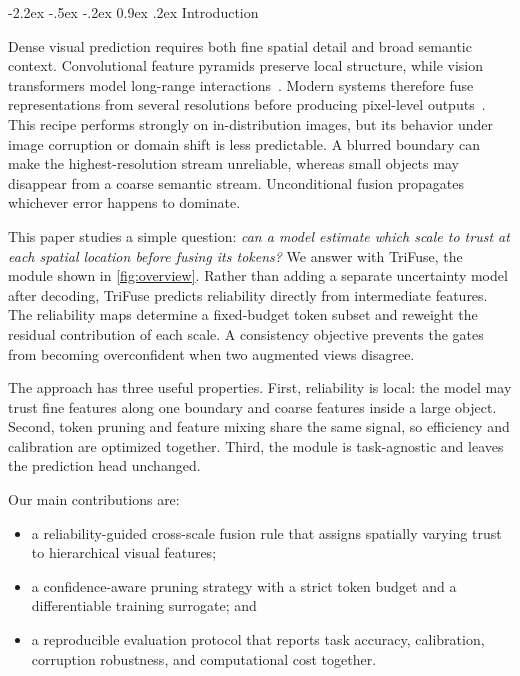 \documentclass[10pt,twocolumn,letterpaper]{article}
\makeatletter
\newcommand{\method}{TriFuse}
\renewcommand\section{\@startsection{section}{1}{\z@}%
  {-2.2ex \@plus -.5ex \@minus -.2ex}%
  {0.9ex \@plus .2ex}%
  {\normalfont\large\bfseries\color{iccvblue}}}
\makeatother
\begin{document}
\section{Introduction}
\label{sec:introduction}

Dense visual prediction requires both fine spatial detail and broad semantic
context. Convolutional feature pyramids preserve local structure, while vision
transformers model long-range interactions~\cite{he2016resnet,dosovitskiy2021vit,
liu2021swin}. Modern systems therefore fuse representations from several
resolutions before producing pixel-level outputs~\cite{lin2017fpn,
cheng2022mask2former}. This recipe performs strongly on in-distribution images,
but its behavior under image corruption or domain shift is less predictable.
A blurred boundary can make the highest-resolution stream unreliable, whereas
small objects may disappear from a coarse semantic stream. Unconditional
fusion propagates whichever error happens to dominate.

This paper studies a simple question: \emph{can a model estimate which scale to
trust at each spatial location before fusing its tokens?} We answer with
\method, the module shown in \cref{fig:overview}. Rather than adding a separate
uncertainty model after decoding, \method{} predicts reliability directly from
intermediate features. The reliability maps determine a fixed-budget token
subset and reweight the residual contribution of each scale. A consistency
objective prevents the gates from becoming overconfident when two augmented
views disagree.

The approach has three useful properties. First, reliability is local: the
model may trust fine features along one boundary and coarse features inside a
large object. Second, token pruning and feature mixing share the same signal,
so efficiency and calibration are optimized together. Third, the module is
task-agnostic and leaves the prediction head unchanged.

Our main contributions are:
\begin{itemize}
  \item a reliability-guided cross-scale fusion rule that assigns spatially
        varying trust to hierarchical visual features;
  \item a confidence-aware pruning strategy with a strict token budget and a
        differentiable training surrogate; and
  \item a reproducible evaluation protocol that reports task accuracy,
        calibration, corruption robustness, and computational cost together.
\end{itemize}
\end{document}
